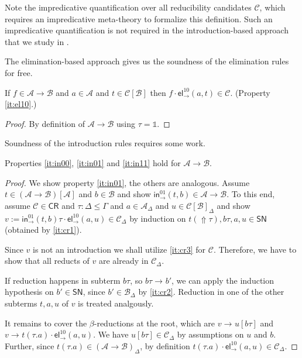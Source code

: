 \documentclass[a4paper,USenglish,cleveref, autoref, thm-restate]{lipics-v2019}
\newcommand{\sid}{\mathds{1}}
\newcommand{\tin}{\ensuremath{\mathsf{in}}}
\newcommand{\inn}[2]{\ensuremath{\tin_{#1}^{#2}}}
\newcommand{\tel}{\mathsf{el}}
\newcommand{\el}[2]{\ensuremath{\tel_{#1}^{#2}}}
\newcommand{\red}[1][]{\longrightarrow_{#1}}
\newcommand{\CR}{\mathsf{CR}}
\newcommand{\A}{\mathcal{A}}
\newcommand{\B}{\mathcal{B}}
\newcommand{\C}{\mathcal{C}}
\newcommand{\SN}{\mathsf{SN}}
\newcommand{\Up}{\mathop{\Uparrow}}
\newcommand{\indy}[1]{_{#1}}
\newcommand{\indyp}[2]{(#1)_{#2}}
\newcommand{\ind}[1]{}    %
\newcommand{\indp}[2]{#1} %
\begin{document}
Note the impredicative quantification over all reducibility candidates
$\C$, which requires an impredicative meta-theory to formalize this
definition.  Such an impredicative quantification is not required in
the introduction-based approach that we study in .

The elimination-based approach gives us the soundness of the
elimination rules for free.
\begin{lemma}[Elimination]
  If $f \in \A \to \B$ and $a \in \A$ and $t \in \C[\B]$ then
  $f \cdot \el\to{10}(a,t) \in \C$.
  (Property \ref{it:el10}.)
\end{lemma}
\begin{proof}
  By definition of $\A \to \B$ using $\tau = \sid$.
\end{proof}

Soundness of the introduction rules requires some work.
\begin{lemma}[Introduction]
  Properties \ref{it:in00}, \ref{it:in01} and \ref{it:in11} hold for
  $\A \to \B$.
\end{lemma}
\begin{proof}
  We show property \ref{it:in01}, the others are analogous.  Assume
  $t \in (\A \to \B)[\A]\ind\Gamma$ and $b \in \B\ind\Gamma$ and show
  $\inn\to{01}(t,b) \in \indp{\A \to \B}{\Gamma}$.  To this end, assume
  $\C \in \CR$ and
  $\tau : \Delta \leq \Gamma$ and
  $a \in \A\indy\Delta$ and $u \in \C[\B]\indy\Delta$ and
  show $v := \inn\to{01}(t,b)\tau \cdot \el\to{10}(a,u) \in \C\indy\Delta$ by
  induction on $t(\Up\tau),b\tau,a,u \in \SN$ (obtained by \ref{it:cr1}).

  Since $v$ is not an introduction we shall utilize \ref{it:cr3} for
  $\C$.  Therefore, we have to show that all reducts of $v$ are
  already in $\C\indy\Delta$.

  If reduction happens in subterm $b\tau$, so $b\tau \red b'$, we can apply
  the induction hypothesis on $b' \in \SN$, since $b' \in \B\indy\Delta$
  by \ref{it:cr2}.  Reduction in one of the other subterms $t,a,u$ of
  $v$ is treated analgously.

  It remains to cover the $\beta$-reductions at the root, which are
  $v \red u[b\tau]$ and $v \red t(\tau.a) \cdot \el\to{10}(a,u)$.
  We have $u[b\tau] \in \C\indy\Delta$ by assumptions on $u$ and $b$.  Further, since
  $t(\tau.a) \in \indyp{\A \to \B}{\Delta}$, by definition $t(\tau.a) \cdot
  \el\to{10}(a,u) \in \C\indy\Delta$.
\end{proof}
\end{document}
